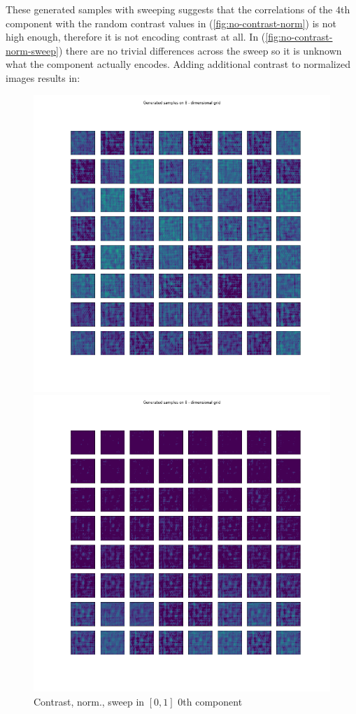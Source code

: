 \documentclass[12pt, english]{article}
\begin{document}
\par  These generated samples with sweeping suggests that the correlations of the $4$th component with the random contrast values in (\ref{fig:no-contrast-norm}) is not high enough, therefore it is not encoding contrast at all. In (\ref{fig:no-contrast-norm-sweep}) there are no trivial differences across the sweep so it is unknown what the component actually encodes. Adding additional contrast to normalized images results in:

\vspace{4mm}
 
\begin{figure}[H]
  \begin{minipage}{0.5\linewidth}
    \centering
    \includegraphics[width=.85\linewidth]{sweep/norm_contrast_sweep_zero_to_one_0th_param.png} 
    \caption{Contrast, norm., sweep in $[0, 1]$ \newline $0$th component} 
    \label{fig:contrast-norm-sweep-0}
  \end{minipage} 
  \begin{minipage}{0.5\linewidth}
    \centering
    \includegraphics[width=.85\linewidth]{sweep/norm_contrast_sweep_minus_two_to_one_2nd_param.png} 

\end{minipage}
\end{figure}
\end{document}
